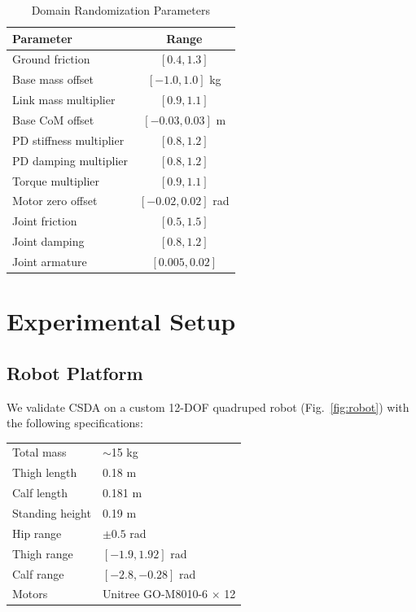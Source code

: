 \documentclass[conference]{IEEEtran}
\begin{document}
\begin{table}[t]
\caption{Domain Randomization Parameters}
\label{tab:dr}
\centering
\begin{tabular}{lc}
\toprule
\textbf{Parameter} & \textbf{Range} \\
\midrule
Ground friction & $[0.4, 1.3]$ \\
Base mass offset & $[-1.0, 1.0]$ kg \\
Link mass multiplier & $[0.9, 1.1]$ \\
Base CoM offset & $[-0.03, 0.03]$ m \\
PD stiffness multiplier & $[0.8, 1.2]$ \\
PD damping multiplier & $[0.8, 1.2]$ \\
Torque multiplier & $[0.9, 1.1]$ \\
Motor zero offset & $[-0.02, 0.02]$ rad \\
Joint friction & $[0.5, 1.5]$ \\
Joint damping & $[0.8, 1.2]$ \\
Joint armature & $[0.005, 0.02]$ \\
\bottomrule
\end{tabular}
\end{table}

\section{Experimental Setup}

\subsection{Robot Platform}

We validate CSDA on a custom 12-DOF quadruped robot (Fig.~\ref{fig:robot}) with the following specifications:

\begin{table}[h]
\centering
\begin{tabular}{ll}
\toprule
Total mass & $\sim$15 kg \\
Thigh length & 0.18 m \\
Calf length & 0.181 m \\
Standing height & 0.19 m \\
Hip range & $\pm 0.5$ rad \\
Thigh range & $[-1.9, 1.92]$ rad \\
Calf range & $[-2.8, -0.28]$ rad \\
Motors & Unitree GO-M8010-6 $\times$ 12 \\
\bottomrule
\end{tabular}
\end{table}
\end{document}
